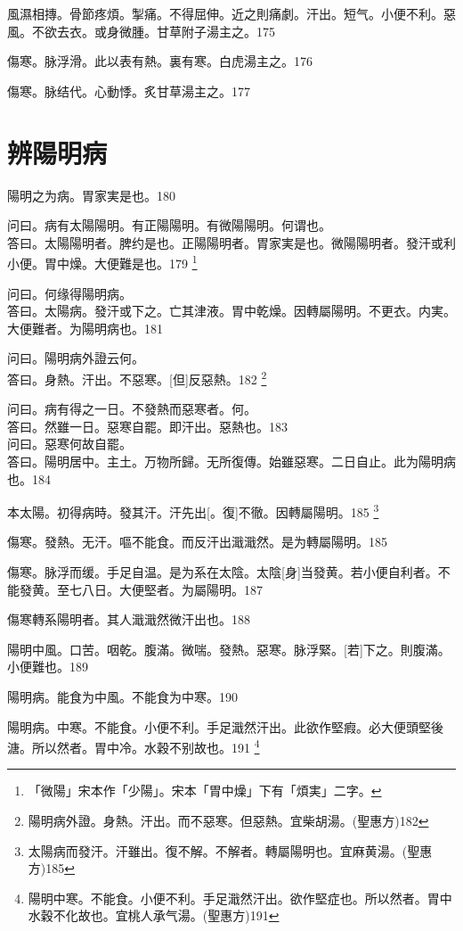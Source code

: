 \documentclass[11pt,oneside,b5paper]{ctexbook}
\begin{document}
\begin{flushleft}
風濕相摶。骨節疼煩。掣痛。不得屈伸。近之則痛劇。汗出。短气。小便不利。惡風。不欲去衣。或身微腫。甘草附子湯主之。175

傷寒。脉浮滑。此以表有熱。裏有寒。白虎湯主之。176

傷寒。脉结代。心動悸。炙甘草湯主之。177

\chapter{辨陽明病}

陽明之为病。胃家実是也。180

问曰。病有太陽陽明。有正陽陽明。有微陽陽明。何谓也。\\
答曰。太陽陽明者。脾约是也。正陽陽明者。胃家実是也。微陽陽明者。發汗或利小便。胃中燥。大便難是也。179
\footnote{「微陽」宋本作「少陽」。宋本「胃中燥」下有「煩実」二字。}

问曰。何缘得陽明病。\\
答曰。太陽病。發汗或下之。亡其津液。胃中乾燥。因轉屬陽明。不更衣。内実。大便難者。为陽明病也。181

问曰。陽明病外證云何。\\
答曰。身熱。汗出。不惡寒。[但]反惡熱。182
\footnote{陽明病外證。身熱。汗出。而不惡寒。但惡熱。宜柴胡湯。(聖惠方)182}

问曰。病有得之一日。不發熱而惡寒者。何。\\
答曰。然雖一日。惡寒自罷。即汗出。惡熱也。183\\
问曰。惡寒何故自罷。\\
答曰。陽明居中。主土。万物所歸。无所復傳。始雖惡寒。二日自止。此为陽明病也。184

本太陽。初得病時。發其汗。汗先出[。復]不徹。因轉屬陽明。185
\footnote{太陽病而發汗。汗雖出。復不解。不解者。轉屬陽明也。宜麻黄湯。(聖惠方)185}

傷寒。發熱。无汗。嘔不能食。而反汗出濈濈然。是为轉屬陽明。185

傷寒。脉浮而缓。手足自温。是为系在太陰。太陰[身]当發黄。若小便自利者。不能發黄。至七八日。大便堅者。为屬陽明。187

傷寒轉系陽明者。其人濈濈然微汗出也。188

陽明中風。口苦。咽乾。腹滿。微喘。發熱。惡寒。脉浮緊。[若]下之。則腹滿。小便難也。189

陽明病。能食为中風。不能食为中寒。190

陽明病。中寒。不能食。小便不利。手足濈然汗出。此欲作堅瘕。必大便頭堅後溏。所以然者。胃中冷。水穀不别故也。191
\footnote{陽明中寒。不能食。小便不利。手足濈然汗出。欲作堅症也。所以然者。胃中水穀不化故也。宜桃人承气湯。(聖惠方)191}


\end{flushleft}
\end{document}
